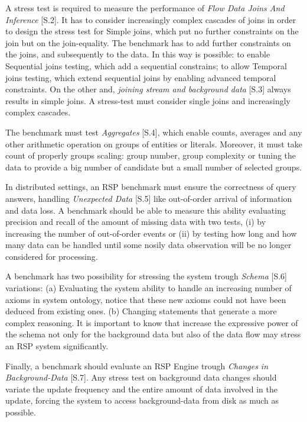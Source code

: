A stress test is required to measure the performance of \textit{Flow Data Joins And Inference} [S.2]. It has to consider increasingly complex cascades of joins in order to design the stress test for Simple joins, which put no further constraints on the join but on the join-equality. The benchmark has to add further constraints on the joins, and subsequently to the data. In this way is possible: to enable Sequential joins testing, which add a sequential constrains;  to allow Temporal joins testing, which extend sequential joins by enabling advanced temporal constraints. On the other and, \textit{joining stream and background data} [S.3] always results in simple joins. A stress-test must consider single joins and increasingly complex cascades.

The benchmark must test \textit{Aggregates} [S.4], which enable counts, averages and any other arithmetic operation on groups of entities or literals. Moreover, it must take count of properly groups scaling: group number, group complexity or tuning the data to provide a big number of candidate but a small number of selected groups.

In distributed settings, an RSP benchmark must ensure the correctness of query answers, handling \textit{Unexpected Data} [S.5] like out-of-order arrival of information and data loss. A benchmark should be able to measure this ability evaluating precision and recall of the amount of missing data with two tests, (i) by increasing the number of out-of-order events or (ii) by testing how long and how many data can be handled until some nosily data observation will be no longer considered for processing.

A benchmark has two possibility for stressing the system trough \textit{Schema} [S.6] variations: (a) Evaluating the system ability to handle an increasing number of axioms in system ontology, notice that these new axioms could not have been deduced from existing ones. (b) Changing statements that generate a more complex reasoning. It is important to know that increase the expressive power of the schema not only for the background data but also of the data flow may stress an RSP system significantly.

Finally, a benchmark should evaluate an RSP Engine trough \textit{Changes in Background-Data} [S.7]. Any stress test on background data changes should variate the update frequency and the entire amount of data involved in the update, forcing the system to access background-data from disk as much as possible.

